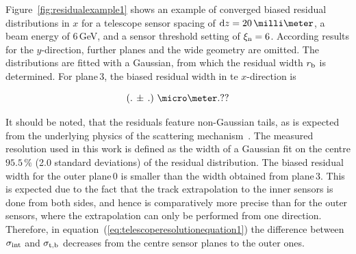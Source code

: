Figure~\ref{fig:residualexample1} shows an example of converged biased residual distributions in $x$ for a telescope sensor spacing of $\dz = 20\,\milli\meter$,
 a beam energy of 6\,GeV, and a sensor threshold setting of $\xi_{\textrm{n}} = 6$. 
According results for the $y$-direction, further planes and the wide geometry are omitted. 
The distributions are fitted with a Gaussian, from which the residual width $r_{\textrm{b}}$ is determined. 
For plane\,3, the biased residual width in te $x$-direction is 

\begin{equation}
\left( .\,\pm\, \allowbreak . \right)\,\micro\meter. ?? 
\end{equation}

\noindent
It should be noted, that the residuals feature non-Gaussian tails, as is expected from the underlying physics of the scattering mechanism~\cite{ref:PDG-2014}. 
The measured resolution used in this work is defined as the width of a Gaussian fit on the centre $95.5\,\%$ (2.0 standard deviations) of the residual distribution.
The biased residual width for the outer plane\,0 is smaller than the width obtained from plane\,3.
This is expected due to the fact that the track extrapolation to the inner sensors is done from both sides, and hence is comparatively more precise than for the outer sensors,
 where the extrapolation can only be performed from one direction. 
Therefore, in equation~(\ref{eq:telescoperesolutionequation1}) the difference between $\sigma_{\textrm{int}}$ and $\sigma_{\textrm{t,b}}$ decreases from the centre sensor planes to the outer ones. 

% 

